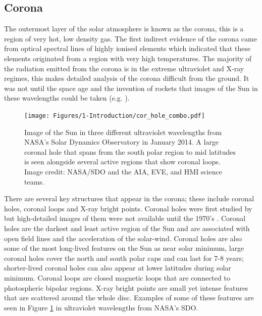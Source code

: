  \subsection{Corona}
The outermost layer of the solar atmosphere is known as the corona, this is a region of very hot, low density gas. The first indirect evidence of the corona came from optical spectral lines of highly ionised elements \citep{Grotrian_1939} which indicated that these elements originated from a region with very high temperatures. The majority of the radiation emitted from the corona is in the extreme ultraviolet and X-ray regimes, this makes detailed analysis of the corona difficult from the ground. It was not until the space age and the invention of rockets that images of the Sun in these wavelengths could be taken (e.g. \citealt{van_Speybroeck_etal_1970}).


\begin{figure}
    \centering
    \texttt{[image: Figures/1-Introduction/cor\_hole\_combo.pdf]}
    \caption[UV image of Sun showing coronal features]{Image of the Sun in three different ultraviolet wavelengths from NASA's Solar Dynamics Observatory in January 2014. A large coronal hole that spans from the south polar region to mid latitudes is seen alongside several active regions that show coronal loops. Image credit: NASA/SDO and the AIA, EVE, and HMI science teams.}
    \label{fig:corona_structure}
\end{figure}

There are several key structures that appear in the corona; these include coronal holes, coronal loops and X-ray bright points. Coronal holes were first studied by \citet{Waldmeier_1956} but high-detailed images of them were not available until the 1970's \citep{Huber_etal_1974}. Coronal holes are the darkest and least active region of the Sun and are associated with open field lines and the acceleration of the solar-wind. Coronal holes are also some of the most long-lived features on the Sun as near solar minimum, large coronal holes cover the north and south polar caps and can last for 7-8 years; shorter-lived coronal holes can also appear at lower latitudes during solar minimum. Coronal loops are closed magnetic loops that are connected to photospheric bipolar regions. X-ray bright points are small yet intense features that are scattered around the whole disc. Examples of some of these features are seen in Figure \ref{fig:corona_structure} in ultraviolet wavelengths from NASA's SDO.

